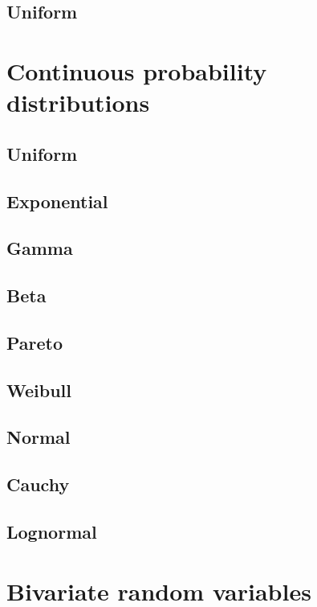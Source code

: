 \subsection{Uniform}

\section{Continuous probability distributions}

\subsection{Uniform}

\subsection{Exponential}

\subsection{Gamma}

\subsection{Beta}

\subsection{Pareto}

\subsection{Weibull}

\subsection{Normal}

\subsection{Cauchy}

\subsection{Lognormal}

\section{Bivariate random variables}
